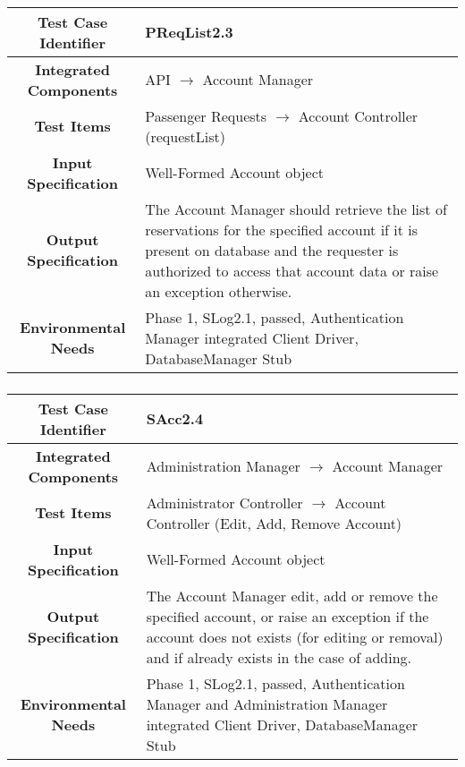 \documentclass[11pt, a4paper,titlepage]{article}
\begin{document}
		 \subsubsection{}
		 \begin{tabularx}{\textwidth}{| c|X|}
		 	\hline \textbf{Test Case Identifier} & \label{PReqList2.3}PReqList2.3 \\
		 	\hline \textbf{Integrated Components} & API $\rightarrow $ Account Manager \\
		 	\hline \textbf{Test Items} &  Passenger Requests  $\rightarrow $ Account Controller (requestList)\\
		 	\hline \textbf{Input Specification} &  Well-Formed Account object\\
		 	\hline \textbf{Output Specification} & The Account Manager should retrieve the list of reservations for the specified account if it is present on database and the requester is authorized to access that account data or raise an exception otherwise.\\
		 	\hline \textbf{Environmental Needs} &  Phase 1, SLog2.1, passed, \newline Authentication Manager integrated \newline 
		 	Client Driver, DatabaseManager Stub\\
		 	\hline
		 \end{tabularx}
		 \newline
		
		 \subsubsection{}
 		 \begin{tabularx}{\textwidth}{| c|X|}
	 		 	\hline \textbf{Test Case Identifier} & \label{SAcc2.4}SAcc2.4 \\
	 		 	\hline \textbf{Integrated Components} &  Administration Manager $\rightarrow $ Account Manager \\
	 		 	\hline \textbf{Test Items} &  Administrator Controller  $\rightarrow $ Account Controller (Edit, Add, Remove Account)\\
	 		 	\hline \textbf{Input Specification} &  Well-Formed Account object\\
	 		 	\hline \textbf{Output Specification} & The Account Manager edit, add or remove the specified account, or raise an exception if the account does not exists (for editing or removal) and if already exists in the case of adding.\\
	 		 	\hline \textbf{Environmental Needs} & Phase 1, SLog2.1, passed, \newline Authentication Manager and Administration Manager integrated \newline 
	 		 	Client Driver, DatabaseManager Stub\\
	 		 	\hline
 		 \end{tabularx}
 		 \newline
	\newpage	 
\end{document}
